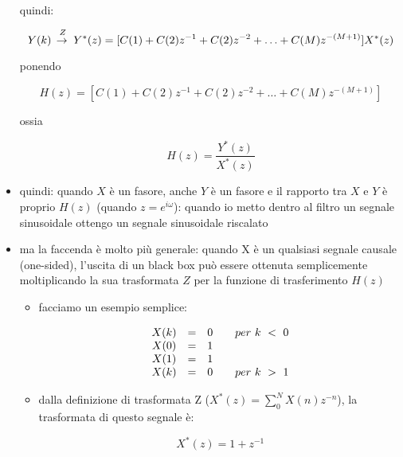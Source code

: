 \begin{itemize}
     quindi:

		 \begin{equation}
						 Y(k)\,\raiseto{Z}\,Y^{*}(z) = [ C(1)+C(2)z^{-1}+C(2)z^{-2}+ \ldots +C(M)z^{-(M+1)} ] X^{*}(z)
		 \end{equation}
 
		 ponendo
 
		 \begin{equation}
			 H(z) = [ C(1)+C(2)z^{-1}+C(2)z^{-2}+ \ldots +C(M)z^{-(M+1)} ]
		 \end{equation}
 
     ossia
 
		 \begin{equation}
						 H(z) = \frac{Y^{*}(z)}{X^{*}(z)}
		 \end{equation}
 
\item quindi: quando $X$ \`e un fasore, anche $Y$ \`e un fasore e il rapporto tra $X$ e
			$Y$ \`e proprio $H(z)$ (quando $z = e^{i\omega}$): quando io metto dentro al filtro un
      segnale sinusoidale ottengo un segnale sinusoidale riscalato

\item ma la faccenda \`e molto pi\`u generale: quando X  \`e  un  qualsiasi
      segnale causale (one-sided), l'uscita di un black box pu\`o  essere
      ottenuta semplicemente moltiplicando la sua trasformata $Z$  per  la
      funzione di trasferimento $H(z)$
 
			\begin{itemize}

			\item facciamo un esempio semplice:
 
				\begin{equation}
	 			\begin{array}{c c c l}
	  			X(k) & = & 0  & \quad per~k~<~0\\
         X(0) & = & 1  &          \\
         X(1) & = & 1  &          \\
				 X(k) & = & 0  & \quad per~k~>~1\\
					\end{array}
			 \end{equation}
 
 \item dalla definizione di trasformata Z ($X^{*}(z) = \sum_0^{N}{X(n)z^{-n}}$), la trasformata di questo segnale \`e:

				 \begin{equation}
								 X^{*}(z) = 1 + z^{-1}
				 \end{equation}
 

\end{itemize}
\end{itemize}
